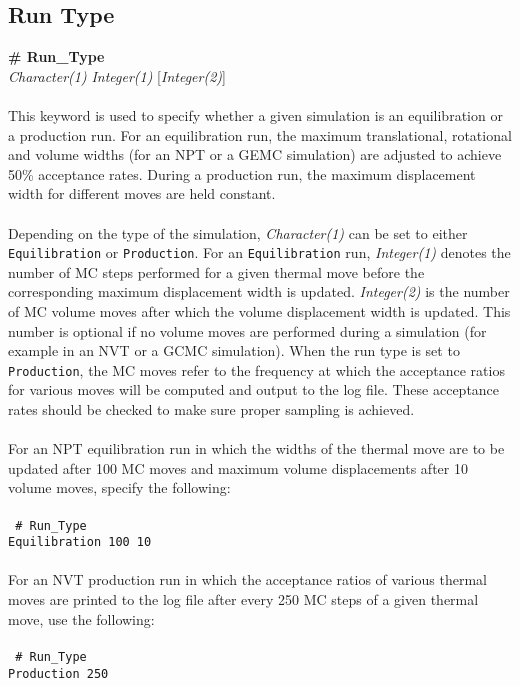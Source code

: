 \subsection{Run Type}\label{sec:Run_Type}
{\bf \# Run\_Type} \\
{\it Character(1)} {\it Integer(1)} [{\it Integer(2)}] \\ \\
%
This keyword is used to specify whether a given simulation is an equilibration or a production run.
For an equilibration run, the maximum translational, rotational and volume widths (for an NPT or a GEMC
simulation) are adjusted to achieve 50\% acceptance rates. During a production run, the maximum
displacement width for different moves are held constant. \\ \\
%
Depending on the type of the simulation,
{\it Character(1)} can be set to either \texttt{Equilibration} or \texttt{Production}.  For an \texttt{Equilibration} run, {\it Integer(1)} denotes
the number of MC steps performed for a given thermal move before the corresponding maximum
displacement width is updated. {\it Integer(2)} is the number of MC volume moves after which the volume
displacement width is updated. This number is optional if no volume moves are performed during a simulation (for example in an NVT or
a GCMC simulation). When the run type is set to \texttt{Production}, the MC moves refer to the frequency at which the acceptance
ratios for various moves will be computed and output to the log file. These acceptance rates should be checked to make sure proper sampling is achieved. \\ \\
%
For an NPT equilibration run in which the widths of the thermal move are to be updated after 100 MC moves and
maximum volume displacements after 10 volume moves, specify the following: \\ \\
%
\texttt{
\# Run\_Type \\
Equilibration 100 10 \\ \\}
%
% 
For an NVT production run in which the acceptance ratios of various thermal moves are printed to the log file after
every 250 MC steps of a given thermal move, use the following: \\ \\
%
\texttt{
\# Run\_Type \\
Production 250}
%
%
%
